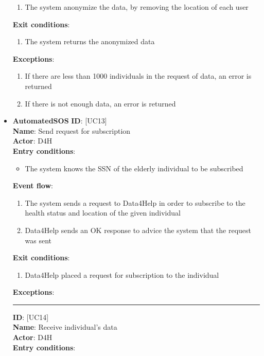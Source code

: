 \documentclass[12pt]{article}
\newcommand\usecase[1]{ [UC#1] }
\begin{document}
\begin{itemize}
\begin{enumerate}
    			\item{The system anonymize the data, by removing the location of each user}
  		\end{enumerate}
  	\textbf{Exit conditions}:
  		\begin{enumerate}
    			\item{The system returns the anonymized data}
  		\end{enumerate}
  	\textbf{Exceptions}: 
  		\begin{enumerate}
    			\item{If there are less than 1000 individuals in the request of data, an error is returned}
    			\item{If there is not enough data, an error is returned}
  		\end{enumerate}
  	\item{\textbf{AutomatedSOS}}
  	\textbf{ID}: \usecase{13} \\
  	\textbf{Name}: Send request for subscription \\
    \textbf{Actor}: D4H \\
    \textbf{Entry conditions}: 
    		\begin{itemize}
    			\item{The system knows the SSN of the elderly individual to be subscribed}
    		\end{itemize}
  	\textbf{Event flow}:
  		\begin{enumerate}
    			\item{The system sends a request to Data4Help in order to subscribe to the health status and location of the given individual}
    			\item{Data4Help sends an OK response to advice the system that the request was sent}
  		\end{enumerate}
  	\textbf{Exit conditions}:
  		\begin{enumerate}
    			\item{Data4Help placed a request for subscription to the individual}
  		\end{enumerate}
  	\textbf{Exceptions}: \\
  	\rule{\linewidth}{0.4pt}
  	\textbf{ID}: \usecase{14} \\
  	\textbf{Name}: Receive individual's data \\
    \textbf{Actor}: D4H \\
    \textbf{Entry conditions}: 
    		\begin{itemize}

\end{itemize}
\end{itemize}
\end{document}
